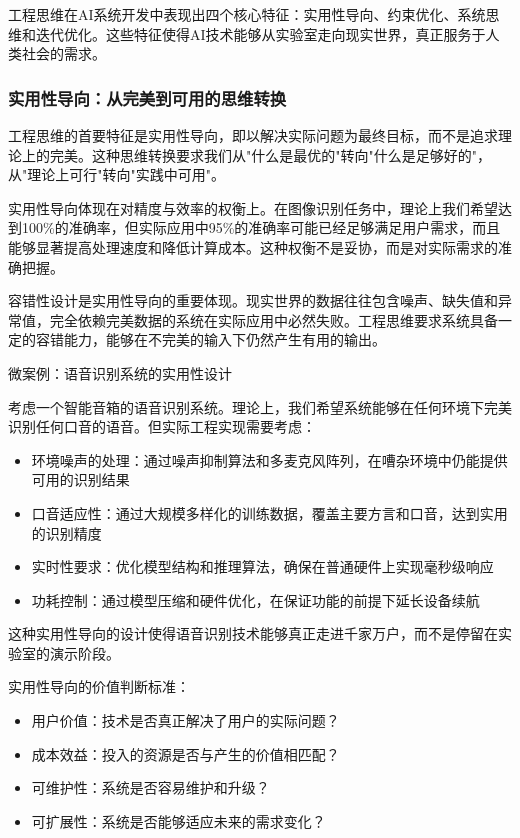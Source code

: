 工程思维在AI系统开发中表现出四个核心特征：实用性导向、约束优化、系统思维和迭代优化。这些特征使得AI技术能够从实验室走向现实世界，真正服务于人类社会的需求。

\subsubsection{实用性导向：从完美到可用的思维转换}

工程思维的首要特征是实用性导向，即以解决实际问题为最终目标，而不是追求理论上的完美。这种思维转换要求我们从"什么是最优的"转向"什么是足够好的"，从"理论上可行"转向"实践中可用"。

实用性导向体现在对精度与效率的权衡上。在图像识别任务中，理论上我们希望达到100\%的准确率，但实际应用中95\%的准确率可能已经足够满足用户需求，而且能够显著提高处理速度和降低计算成本。这种权衡不是妥协，而是对实际需求的准确把握。

容错性设计是实用性导向的重要体现。现实世界的数据往往包含噪声、缺失值和异常值，完全依赖完美数据的系统在实际应用中必然失败。工程思维要求系统具备一定的容错能力，能够在不完美的输入下仍然产生有用的输出。

微案例：语音识别系统的实用性设计

考虑一个智能音箱的语音识别系统。理论上，我们希望系统能够在任何环境下完美识别任何口音的语音。但实际工程实现需要考虑：

\begin{itemize}
\item 环境噪声的处理：通过噪声抑制算法和多麦克风阵列，在嘈杂环境中仍能提供可用的识别结果
\item 口音适应性：通过大规模多样化的训练数据，覆盖主要方言和口音，达到实用的识别精度
\item 实时性要求：优化模型结构和推理算法，确保在普通硬件上实现毫秒级响应
\item 功耗控制：通过模型压缩和硬件优化，在保证功能的前提下延长设备续航
\end{itemize}

这种实用性导向的设计使得语音识别技术能够真正走进千家万户，而不是停留在实验室的演示阶段。

实用性导向的价值判断标准：

\begin{itemize}
\item 用户价值：技术是否真正解决了用户的实际问题？
\item 成本效益：投入的资源是否与产生的价值相匹配？
\item 可维护性：系统是否容易维护和升级？
\item 可扩展性：系统是否能够适应未来的需求变化？
\end{itemize}


